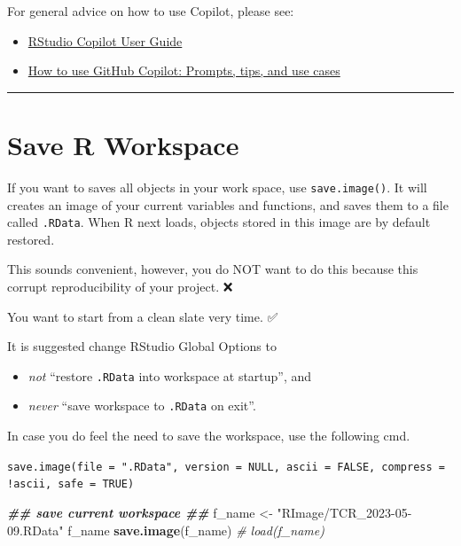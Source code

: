 \documentclass[
]{book}
\newenvironment{Shaded}{\begin{snugshade}}{\end{snugshade}}
\newcommand{\CommentTok}[1]{\textcolor[rgb]{0.56,0.35,0.01}{\textit{#1}}}
\newcommand{\DocumentationTok}[1]{\textcolor[rgb]{0.56,0.35,0.01}{\textbf{\textit{#1}}}}
\newcommand{\FunctionTok}[1]{\textcolor[rgb]{0.13,0.29,0.53}{\textbf{#1}}}
\newcommand{\NormalTok}[1]{#1}
\newcommand{\OtherTok}[1]{\textcolor[rgb]{0.56,0.35,0.01}{#1}}
\newcommand{\StringTok}[1]{\textcolor[rgb]{0.31,0.60,0.02}{#1}}
\providecommand{\tightlist}{%
  \setlength{\itemsep}{0pt}\setlength{\parskip}{0pt}}
\theoremstyle{definition}
\theoremstyle{definition}
\theoremstyle{definition}
\theoremstyle{definition}
\theoremstyle{remark}
\begin{document}
For general advice on how to use Copilot, please see:

\begin{itemize}
\tightlist
\item
  \href{https://docs.posit.co/ide/user/ide/guide/tools/copilot.html}{RStudio Copilot User Guide}
\item
  \href{https://github.blog/2023-06-20-how-to-write-better-prompts-for-github-copilot/}{How to use GitHub Copilot: Prompts, tips, and use cases}
\end{itemize}

\begin{center}\rule{0.5\linewidth}{0.5pt}\end{center}

\section{Save R Workspace}\label{save-r-workspace}

If you want to saves {all objects} in your work space, use \texttt{save.image()}. It will creates an image of your current variables and functions, and saves them to a file called \texttt{.RData}. When R next loads, objects stored in this image are by default restored.

This sounds convenient, however, you do NOT want to do this because this corrupt {reproducibility} of your project. ❌

You want to {start from a clean slate} very time. ✅

It is suggested change RStudio Global Options to

\begin{itemize}
\tightlist
\item
  \emph{not} ``restore \texttt{.RData} into workspace at startup'', and
\item
  \emph{never} ``save workspace to \texttt{.RData} on exit''.
\end{itemize}

In case you do feel the need to save the workspace, use the following cmd.

\texttt{save.image(file\ =\ ".RData",\ version\ =\ NULL,\ ascii\ =\ FALSE,\ compress\ =\ !ascii,\ safe\ =\ TRUE)}

\begin{Shaded}
\begin{Highlighting}[]
\DocumentationTok{\#\# save current workspace \#\#}
\NormalTok{f\_name }\OtherTok{\textless{}{-}} \StringTok{"RImage/TCR\_2023{-}05{-}09.RData"}
\NormalTok{f\_name}
\FunctionTok{save.image}\NormalTok{(f\_name)}
\CommentTok{\# load(f\_name)}
\end{Highlighting}
\end{Shaded}
\end{document}
